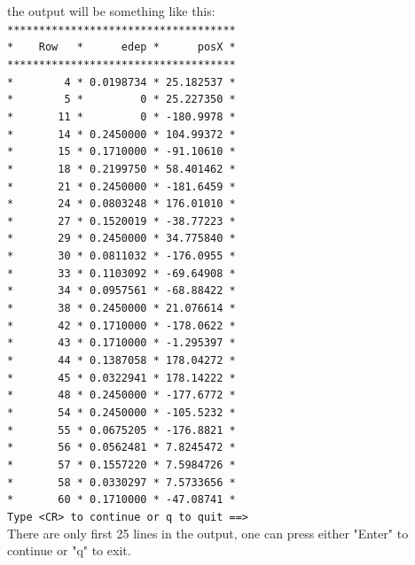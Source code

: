 \documentclass[12pt]{article}
\begin{document}
the output will be something like this:\\
\verb|************************************|\\
\verb|*    Row   *      edep *      posX *|\\
\verb|************************************|\\
\verb|*        4 * 0.0198734 * 25.182537 *|\\
\verb|*        5 *         0 * 25.227350 *|\\
\verb|*       11 *         0 * -180.9978 *|\\
\verb|*       14 * 0.2450000 * 104.99372 *|\\
\verb|*       15 * 0.1710000 * -91.10610 *|\\
\verb|*       18 * 0.2199750 * 58.401462 *|\\
\verb|*       21 * 0.2450000 * -181.6459 *|\\
\verb|*       24 * 0.0803248 * 176.01010 *|\\
\verb|*       27 * 0.1520019 * -38.77223 *|\\
\verb|*       29 * 0.2450000 * 34.775840 *|\\
\verb|*       30 * 0.0811032 * -176.0955 *|\\
\verb|*       33 * 0.1103092 * -69.64908 *|\\
\verb|*       34 * 0.0957561 * -68.88422 *|\\
\verb|*       38 * 0.2450000 * 21.076614 *|\\
\verb|*       42 * 0.1710000 * -178.0622 *|\\
\verb|*       43 * 0.1710000 * -1.295397 *|\\
\verb|*       44 * 0.1387058 * 178.04272 *|\\
\verb|*       45 * 0.0322941 * 178.14222 *|\\
\verb|*       48 * 0.2450000 * -177.6772 *|\\
\verb|*       54 * 0.2450000 * -105.5232 *|\\
\verb|*       55 * 0.0675205 * -176.8821 *|\\
\verb|*       56 * 0.0562481 * 7.8245472 *|\\
\verb|*       57 * 0.1557220 * 7.5984726 *|\\
\verb|*       58 * 0.0330297 * 7.5733656 *|\\
\verb|*       60 * 0.1710000 * -47.08741 *|\\
\verb|Type <CR> to continue or q to quit ==>|\\
There are only first 25 lines in the output, one can press either "Enter" to continue or "q" to exit.
\end{document}

